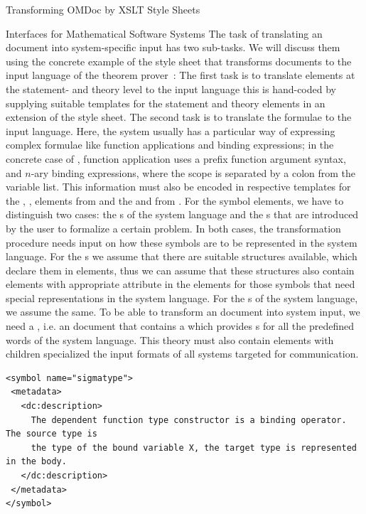 \begin{tchapter}[id=transform-xsl,short=Transforming OMDoc]{Transforming OMDoc by XSLT Style Sheets}
\begin{tsection}[id=omdoctosys,short=Interfaces for Systems]{{\omdoc} Interfaces for Mathematical Software Systems}
The task of translating an {\omdoc} document into system-specific input has two
sub-tasks. We will discuss them using the concrete example of the
{} style sheet that transforms {\omdoc} documents to the input
language of the {\pvs} theorem prover~\cite{OwRu92}: The first task is to translate
elements at the statement- and theory level to the input language this is hand-coded by
supplying suitable templates for the {\omdoc} statement and theory elements in an
extension of the {} style sheet. The second task is to translate
the formulae to the input language. Here, the system usually has a particular way of
expressing complex formulae like function applications and binding expressions; in the
concrete case of {\pvs}, function application uses a prefix function argument syntax, and
$n$-ary binding expressions, where the scope is separated by a colon from the variable
list. This information must also be encoded in respective templates for the
{}, {}, {}
elements from {\openmath} and the {} and {}
from {\cmathml}. For the symbol elements, we have to distinguish two cases: the
{s} of the system language and the {s}
that are introduced by the user to formalize a certain problem. In both cases, the
transformation procedure needs input on how these symbols are to be represented in the
system language. For the {s} we assume that there are suitable
{} structures available, which declare them in {}
elements, thus we can assume that these {} structures also contain
{} elements with appropriate {} attribute in the
{} elements for those symbols that need special representations in
the system language.  For the {s} of the system language, we
assume the same.  To be able to transform an {\omdoc} document into system input, we need
a {}, i.e. an {\omdoc} document that contains a
{} which provides {s} for all the predefined words of the
system language. This theory must also contain {} elements with
{} children specialized the input formats of all systems targeted for
communication.

\begin{lstlisting}[label=lst:system-language,
  caption={A {\element{symbol}} in a Language Definition Theory},
  index={symbol,presentation,style}]
<symbol name="sigmatype">
 <metadata>
   <dc:description>
     The dependent function type constructor is a binding operator. The source type is
     the type of the bound variable X, the target type is represented in the body.
   </dc:description>
 </metadata>
</symbol>


\end{lstlisting}
\end{tsection}
\end{tchapter}
